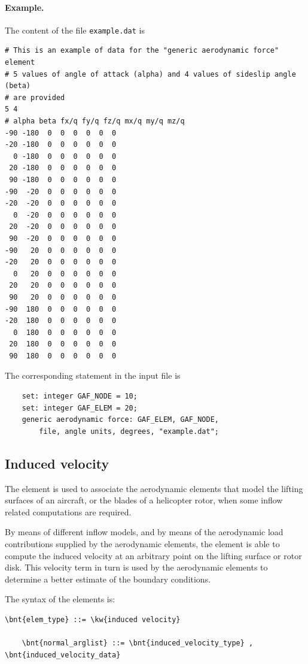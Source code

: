 \paragraph{Example.}
The content of the file \texttt{example.dat} is
\begin{verbatim}
# This is an example of data for the "generic aerodynamic force" element
# 5 values of angle of attack (alpha) and 4 values of sideslip angle (beta)
# are provided
5 4
# alpha beta fx/q fy/q fz/q mx/q my/q mz/q
-90 -180  0  0  0  0  0  0
-20 -180  0  0  0  0  0  0
  0 -180  0  0  0  0  0  0
 20 -180  0  0  0  0  0  0
 90 -180  0  0  0  0  0  0
-90  -20  0  0  0  0  0  0
-20  -20  0  0  0  0  0  0
  0  -20  0  0  0  0  0  0
 20  -20  0  0  0  0  0  0
 90  -20  0  0  0  0  0  0
-90   20  0  0  0  0  0  0
-20   20  0  0  0  0  0  0
  0   20  0  0  0  0  0  0
 20   20  0  0  0  0  0  0
 90   20  0  0  0  0  0  0
-90  180  0  0  0  0  0  0
-20  180  0  0  0  0  0  0
  0  180  0  0  0  0  0  0
 20  180  0  0  0  0  0  0
 90  180  0  0  0  0  0  0
\end{verbatim}
The corresponding statement in the input file is
\begin{verbatim}
    set: integer GAF_NODE = 10;
    set: integer GAF_ELEM = 20;
    generic aerodynamic force: GAF_ELEM, GAF_NODE,
        file, angle units, degrees, "example.dat";
\end{verbatim}



\subsection{Induced velocity}
\label{sec:EL:AERO:INDVEL}
The  element is used to associate the aerodynamic elements
that model the lifting surfaces of an aircraft,
or the blades of a helicopter rotor, when some inflow related computations
are required.

By means of different inflow models, and by means
of the aerodynamic load contributions supplied by the aerodynamic elements,
the  element is able to compute the induced velocity
at an arbitrary point on the lifting surface or rotor disk.
This velocity term in turn is used by the aerodynamic elements to determine
a better estimate of the boundary conditions.

The syntax of the  elements is:
\begin{Verbatim}[commandchars=\\\{\}]
    \bnt{elem_type} ::= \kw{induced velocity}

    \bnt{normal_arglist} ::= \bnt{induced_velocity_type} , \bnt{induced_velocity_data}
\end{Verbatim}

